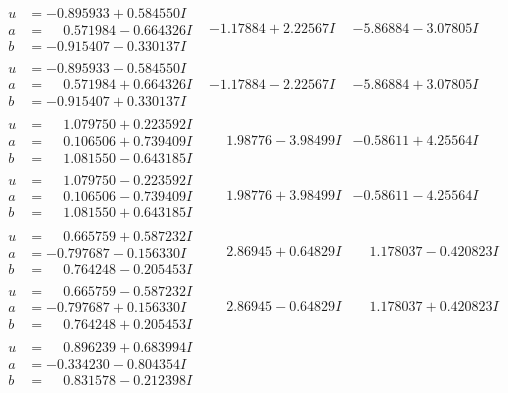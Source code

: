 \documentclass[1p]{elsarticle_modified}
\theoremstyle{definition}
\begin{document}
$$\begin{array}{c|c|c}
\begin{aligned}
u &= -0.895933 + 0.584550 I \\
a &= \phantom{-}0.571984 - 0.664326 I \\
b &= -0.915407 - 0.330137 I\end{aligned}
 & -1.17884 + 2.22567 I & -5.86884 - 3.07805 I \\ \hline\begin{aligned}
u &= -0.895933 - 0.584550 I \\
a &= \phantom{-}0.571984 + 0.664326 I \\
b &= -0.915407 + 0.330137 I\end{aligned}
 & -1.17884 - 2.22567 I & -5.86884 + 3.07805 I \\ \hline\begin{aligned}
u &= \phantom{-}1.079750 + 0.223592 I \\
a &= \phantom{-}0.106506 + 0.739409 I \\
b &= \phantom{-}1.081550 - 0.643185 I\end{aligned}
 & \phantom{-}1.98776 - 3.98499 I & -0.58611 + 4.25564 I \\ \hline\begin{aligned}
u &= \phantom{-}1.079750 - 0.223592 I \\
a &= \phantom{-}0.106506 - 0.739409 I \\
b &= \phantom{-}1.081550 + 0.643185 I\end{aligned}
 & \phantom{-}1.98776 + 3.98499 I & -0.58611 - 4.25564 I \\ \hline\begin{aligned}
u &= \phantom{-}0.665759 + 0.587232 I \\
a &= -0.797687 - 0.156330 I \\
b &= \phantom{-}0.764248 - 0.205453 I\end{aligned}
 & \phantom{-}2.86945 + 0.64829 I & \phantom{-}1.178037 - 0.420823 I \\ \hline\begin{aligned}
u &= \phantom{-}0.665759 - 0.587232 I \\
a &= -0.797687 + 0.156330 I \\
b &= \phantom{-}0.764248 + 0.205453 I\end{aligned}
 & \phantom{-}2.86945 - 0.64829 I & \phantom{-}1.178037 + 0.420823 I \\ \hline\begin{aligned}
u &= \phantom{-}0.896239 + 0.683994 I \\
a &= -0.334230 - 0.804354 I \\
b &= \phantom{-}0.831578 - 0.212398 I\end{aligned}

\end{array}$$
\end{document}
